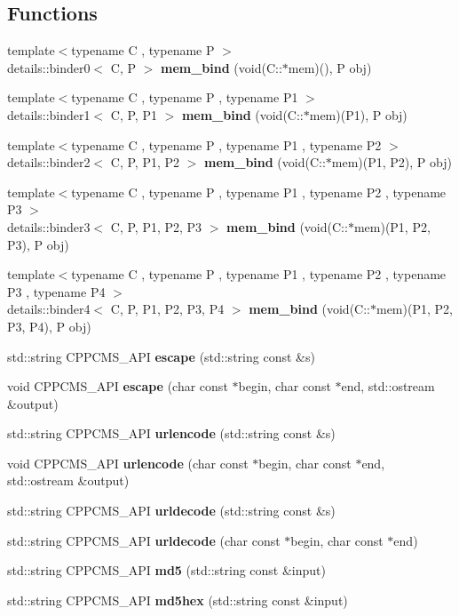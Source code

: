 \subsection*{\-Functions}
\begin{DoxyCompactItemize}
\item 
{\footnotesize template$<$typename C , typename P $>$ }\\details\-::binder0$<$ \-C, \-P $>$ {\bf mem\-\_\-bind} (void(\-C\-::$\ast$mem)(), \-P obj)
\item 
{\footnotesize template$<$typename C , typename P , typename P1 $>$ }\\details\-::binder1$<$ \-C, \-P, \-P1 $>$ {\bf mem\-\_\-bind} (void(\-C\-::$\ast$mem)(\-P1), \-P obj)
\item 
{\footnotesize template$<$typename C , typename P , typename P1 , typename P2 $>$ }\\details\-::binder2$<$ \-C, \-P, \-P1, \-P2 $>$ {\bf mem\-\_\-bind} (void(\-C\-::$\ast$mem)(\-P1, \-P2), \-P obj)
\item 
{\footnotesize template$<$typename C , typename P , typename P1 , typename P2 , typename P3 $>$ }\\details\-::binder3$<$ \-C, \-P, \-P1, \-P2, \*
\-P3 $>$ {\bf mem\-\_\-bind} (void(\-C\-::$\ast$mem)(\-P1, \-P2, \-P3), \-P obj)
\item 
{\footnotesize template$<$typename C , typename P , typename P1 , typename P2 , typename P3 , typename P4 $>$ }\\details\-::binder4$<$ \-C, \-P, \-P1, \-P2, \*
\-P3, \-P4 $>$ {\bf mem\-\_\-bind} (void(\-C\-::$\ast$mem)(\-P1, \-P2, \-P3, \-P4), \-P obj)
\item 
std\-::string \-C\-P\-P\-C\-M\-S\-\_\-\-A\-P\-I {\bf escape} (std\-::string const \&s)
\item 
void \-C\-P\-P\-C\-M\-S\-\_\-\-A\-P\-I {\bf escape} (char const $\ast$begin, char const $\ast$end, std\-::ostream \&output)
\item 
std\-::string \-C\-P\-P\-C\-M\-S\-\_\-\-A\-P\-I {\bf urlencode} (std\-::string const \&s)
\item 
void \-C\-P\-P\-C\-M\-S\-\_\-\-A\-P\-I {\bf urlencode} (char const $\ast$begin, char const $\ast$end, std\-::ostream \&output)
\item 
std\-::string \-C\-P\-P\-C\-M\-S\-\_\-\-A\-P\-I {\bf urldecode} (std\-::string const \&s)
\item 
std\-::string \-C\-P\-P\-C\-M\-S\-\_\-\-A\-P\-I {\bf urldecode} (char const $\ast$begin, char const $\ast$end)
\item 
std\-::string \-C\-P\-P\-C\-M\-S\-\_\-\-A\-P\-I {\bf md5} (std\-::string const \&input)
\item 
std\-::string \-C\-P\-P\-C\-M\-S\-\_\-\-A\-P\-I {\bf md5hex} (std\-::string const \&input)
\end{DoxyCompactItemize}


